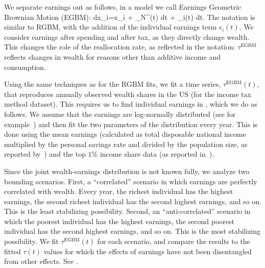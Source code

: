 We separate earnings out as follows, in a model we call Earnings Geometric Brownian Motion (EGBM):
\be
dx_i=x_i + _N\tau^\left(t\right) dt + \epsilon_i\left(t\right) dt.
\ee
The notation is similar to RGBM, with the addition of the individual earnings term $\epsilon_i\left(t\right)$. We consider earnings after spending and after tax, as they directly change wealth. This changes the role of the reallocation rate, as reflected in the notation: $\tau^\text{EGBM}$ reflects changes in wealth for reasons other than additive income and consumption.

Using the same techniques as for the RGBM fits, we fit a time series, $\tau^\text{EGBM}\left(t\right)$, that reproduces annually observed wealth shares in the US (for the income tax method dataset). This requires us to find individual earnings in , which we do as follows.
We assume that the earnings are log-normally distributed (see for example~\cite{pinkovskiy2009parametric}) and then fit the two parameters of the distribution every year. This is done using the mean earnings (calculated as total disposable national income multiplied by the personal savings rate and divided by the population size, as reported by~\cite{PikettyZucman2014}) and the top $1\%$ income share data (as reported in~\cite{WID2017}).

Since the joint wealth-earnings distribution is not known fully, we analyze two bounding scenarios. First, a ``correlated'' scenario in which earnings are perfectly correlated with wealth. Every year, the richest individual has the highest earnings, the second richest individual has the second highest earnings, and so on. This is the least stabilizing possibility. Second, an ``anti-correlated'' scenario in which the poorest individual has the highest earnings, the second poorest individual has the second highest earnings, and so on. This is the most stabilizing possibility. We fit $\tau^\text{EGBM}\left(t\right)$ for each scenario, and compare the results to the fitted $\tau\left(t\right)$ values for which the effects of earnings have not been disentangled from other effects. See .

